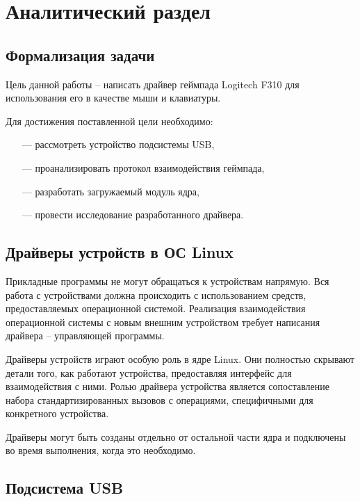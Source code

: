 \section{Аналитический раздел}

\subsection{Формализация задачи}

Цель данной работы -- написать драйвер геймпада Logitech F310 для использования его в качестве мыши и клавиатуры.

Для достижения поставленной цели необходимо:

\begin{itemize}[leftmargin=1.6\parindent]
    \item[---] рассмотреть устройство подсистемы USB,
    \item[---] проанализировать протокол взаимодействия геймпада,
    \item[---] разработать загружаемый модуль ядра,    
    \item[---] провести исследование разработанного драйвера.
\end{itemize}

\subsection{Драйверы устройств в ОС Linux}

Прикладные программы не могут обращаться к устройствам напрямую. Вся работа с устройствами должна происходить с использованием средств, предоставляемых операционной системой. Реализация взаимодействия операционной системы с новым внешним устройством требует написания драйвера -- управляющей программы.

Драйверы устройств играют особую роль в ядре Linux.
Они полностью скрывают детали того, как работают устройства, предоставляя интерфейс для взаимодействия с ними. Ролью драйвера устройства является сопоставление набора стандартизированных вызовов с операциями, специфичными для конкретного устройства.

Драйверы могут быть созданы отдельно от остальной части ядра и подключены во время выполнения, когда это необходимо.

\subsection{Подсистема USB}

